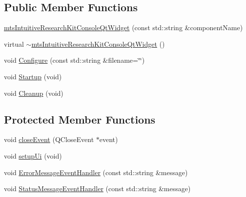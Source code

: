 \subsection*{Public Member Functions}
\begin{DoxyCompactItemize}
\item 
\hyperlink{classmts_intuitive_research_kit_console_qt_widget_a95818a1c10f8ab69daef0a2289ccd574}{mts\+Intuitive\+Research\+Kit\+Console\+Qt\+Widget} (const std\+::string \&component\+Name)
\item 
virtual \hyperlink{classmts_intuitive_research_kit_console_qt_widget_acfc0c03dfd5a161a4abdbc702b83a73d}{$\sim$mts\+Intuitive\+Research\+Kit\+Console\+Qt\+Widget} ()
\item 
void \hyperlink{classmts_intuitive_research_kit_console_qt_widget_a3b08a78bd3b7c7296d28e09ff8216d03}{Configure} (const std\+::string \&filename=\char`\"{}\char`\"{})
\item 
void \hyperlink{classmts_intuitive_research_kit_console_qt_widget_a47f4e75b8867bedffd54088eb96fa5bf}{Startup} (void)
\item 
void \hyperlink{classmts_intuitive_research_kit_console_qt_widget_a182bd380efd6025e05fbac7f21a27dbd}{Cleanup} (void)
\end{DoxyCompactItemize}
\subsection*{Protected Member Functions}
\begin{DoxyCompactItemize}
\item 
void \hyperlink{classmts_intuitive_research_kit_console_qt_widget_abde2dbe3d6edb810072fc25c10b614ec}{close\+Event} (Q\+Close\+Event $\ast$event)
\item 
void \hyperlink{classmts_intuitive_research_kit_console_qt_widget_aa5814a625ee98f9217810e880632d546}{setup\+Ui} (void)
\item 
void \hyperlink{classmts_intuitive_research_kit_console_qt_widget_a3bd6ebbcf80c0600f9b4bb0238af7bfb}{Error\+Message\+Event\+Handler} (const std\+::string \&message)
\item 
void \hyperlink{classmts_intuitive_research_kit_console_qt_widget_a18ae57b96126a74c73e596a43e1153e0}{Status\+Message\+Event\+Handler} (const std\+::string \&message)
\end{DoxyCompactItemize}
